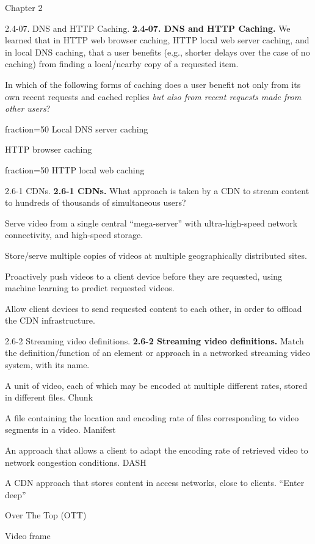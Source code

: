 \documentclass[a4paper]{article}
\begin{document}
\begin{quiz}{Chapter 2}
\begin{multi}[points=1,shuffle,multiple]{2.4-07. DNS and HTTP Caching.}
\textbf{2.4-07. DNS and HTTP Caching.} 
We learned that in HTTP web browser caching, HTTP local web server caching, and in local DNS caching, that a user benefits (e.g., shorter delays over the case of no caching) from finding a local/nearby copy of a requested item. 

In which of the following forms of caching does a user benefit not only from its own recent requests and cached replies \emph{but also from recent requests made from other users}?
\item[fraction=50] Local DNS server caching
\item HTTP browser caching
\item[fraction=50] HTTP local web caching
\end{multi}

\begin{multi}[points=1,shuffle]{2.6-1 CDNs.}
\textbf{2.6-1 CDNs.} 
What approach is taken by a CDN to stream content to hundreds of thousands of simultaneous users?
\item Serve video from a single central ``mega-server'' with ultra-high-speed network connectivity, and high-speed storage.
\item* Store/serve multiple copies of videos at multiple geographically distributed sites.
\item Proactively push videos to a client device before they are requested, using machine learning to predict requested videos.
\item Allow client devices to send requested content to each other, in order to offload the CDN infrastructure.
\end{multi}

\begin{matching}[points=1,shuffle]{2.6-2 Streaming video definitions.}
\textbf{2.6-2 Streaming video definitions.} 
Match the definition/function of an element or approach in a networked streaming video system, with its name.
\item A unit of video, each of which may be encoded at multiple different rates, stored in different files. \answer Chunk
\item A file containing the location and encoding rate of files corresponding to video segments in a video. \answer Manifest
\item An approach that allows a client to adapt the encoding rate of retrieved video to network congestion conditions. \answer DASH
\item A CDN approach that stores content in access networks, close to clients. \answer ``Enter deep''
\item \answer Over The Top (OTT)
\item \answer Video frame
\end{matching}


\end{quiz}
\end{document}
